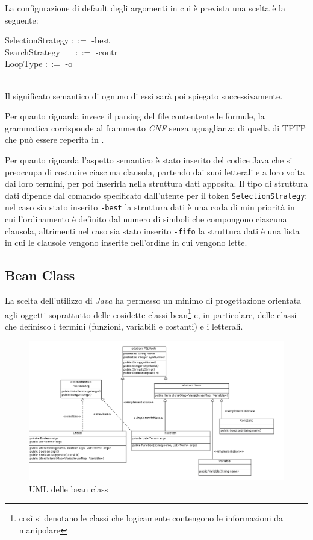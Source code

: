 \documentclass[a4paper,11pt]{article}
\newcommand{\grammarindent}[1][1]{\hspace*{#1\parindent}\ignorespaces}
\begin{document}
La configurazione di default degli argomenti in cui è prevista una scelta è la seguente:\\[1mm]
\begin{ttfamily}
\grammarindent SelectionStrategy $::=$  -best \\
\grammarindent SearchStrategy ~~~$::=$  -contr\\
\grammarindent LoopType $::=$ 	-o \\
\\[1mm]
\end{ttfamily}
Il significato semantico di ognuno di essi sarà poi spiegato successivamente.\par 
Per quanto riguarda invece il parsing del file contentente le formule, la grammatica corrisponde al frammento \emph{CNF} senza uguaglianza di quella di TPTP che può essere reperita in \cite{TPTPsyntax}.\par
Per quanto riguarda l'aspetto semantico è stato inserito del codice Java che si preoccupa di costruire ciascuna clausola, partendo dai suoi letterali e a loro volta dai loro termini, per poi inserirla nella struttura dati apposita. Il tipo di struttura dati dipende dal comando specificato dall'utente per il token \texttt{SelectionStrategy}: nel caso sia stato inserito \texttt{-best} la struttura dati è una coda di min priorità in cui l'ordinamento è definito dal numero di simboli che compongono ciascuna clausola, altrimenti nel caso sia stato inserito \texttt{-fifo} la struttura dati è una lista in cui le clausole vengono inserite nell'ordine in cui vengono lette.

\subsection{Bean Class}
La scelta dell'utilizzo di \emph{Java} ha permesso un minimo di progettazione orientata agli oggetti soprattutto delle cosidette classi bean\footnote{così si denotano le classi che logicamente contengono le informazioni da manipolare} e, in particolare, delle classi che definisco i termini (funzioni, variabili e costanti) e i letterali. 

\begin{figure}[h]
\includegraphics[width=1\columnwidth]{beanClassUML.png}
\caption{\small{UML delle bean class}}
\label{beanClassUML}
\end{figure}
\end{document}
